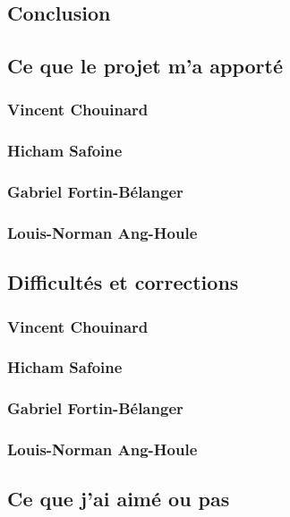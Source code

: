 \documentclass[10pt,a4paper,final]{article}
\begin{document}
\begin{spacing}{1.5}
\pagebreak
\section{Conclusion}

\subsection{Ce que le projet m'a apporté}
\subsubsection{Vincent Chouinard}

\subsubsection{Hicham Safoine}

\subsubsection{Gabriel Fortin-Bélanger}

\subsubsection{Louis-Norman Ang-Houle}



\subsection{Difficultés et corrections}
\subsubsection{Vincent Chouinard}

\subsubsection{Hicham Safoine}

\subsubsection{Gabriel Fortin-Bélanger}

\subsubsection{Louis-Norman Ang-Houle}


\subsection{Ce que j'ai aimé ou pas}

\end{spacing}
\end{document}
